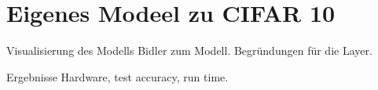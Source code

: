 \section{Eigenes Modeel zu CIFAR 10}

\begin{frame}{Visualisierung des Modells}
    Bidler zum Modell. Begründungen für die Layer.

\end{frame}

\begin{frame}{Ergebnisse}
    Hardware, test accuracy, run time.
\end{frame}
